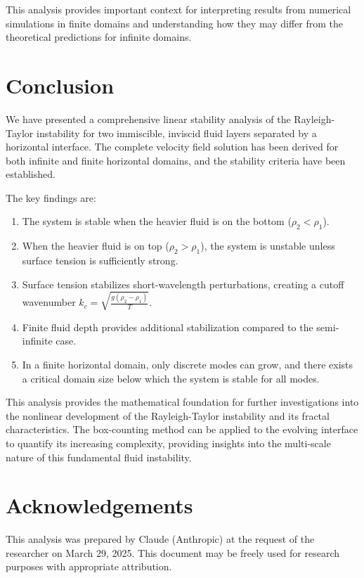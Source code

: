 \documentclass[12pt,a4paper]{article}
\begin{document}
This analysis provides important context for interpreting results from numerical simulations in finite domains and understanding how they may differ from the theoretical predictions for infinite domains.

\section{Conclusion}
We have presented a comprehensive linear stability analysis of the Rayleigh-Taylor instability for two immiscible, inviscid fluid layers separated by a horizontal interface. The complete velocity field solution has been derived for both infinite and finite horizontal domains, and the stability criteria have been established.

The key findings are:
\begin{enumerate}
    \item The system is stable when the heavier fluid is on the bottom ($\rho_2 < \rho_1$).
    \item When the heavier fluid is on top ($\rho_2 > \rho_1$), the system is unstable unless surface tension is sufficiently strong.
    \item Surface tension stabilizes short-wavelength perturbations, creating a cutoff wavenumber $k_c = \sqrt{\frac{g(\rho_2 - \rho_1)}{T}}$.
    \item Finite fluid depth provides additional stabilization compared to the semi-infinite case.
    \item In a finite horizontal domain, only discrete modes can grow, and there exists a critical domain size below which the system is stable for all modes.
\end{enumerate}

This analysis provides the mathematical foundation for further investigations into the nonlinear development of the Rayleigh-Taylor instability and its fractal characteristics. The box-counting method can be applied to the evolving interface to quantify its increasing complexity, providing insights into the multi-scale nature of this fundamental fluid instability.

\section*{Acknowledgements}
This analysis was prepared by Claude (Anthropic) at the request of the researcher on March 29, 2025. This document may be freely used for research purposes with appropriate attribution.
\end{document}
